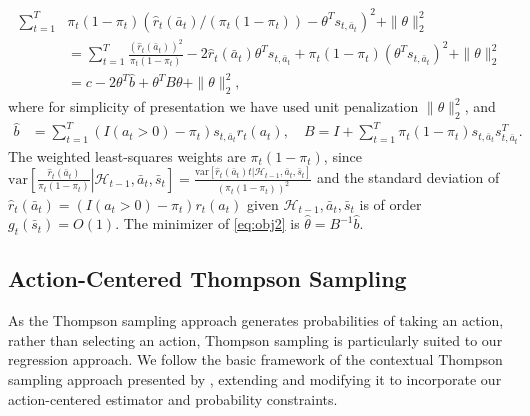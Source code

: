 \documentclass{article}
\begin{document}
\begin{align}\label{eq:obj2}
\sum\nolimits_{t=1}^T&  \pi_t (1-\pi_t)(\hat{r}_t(\bar{a}_t)/(\pi_t (1-\pi_t)) -  \theta^T s_{t,\bar{a}_t} )^2+\|\theta\|_2^2\\\nonumber &= \sum\nolimits_{t=1}^T \frac{(\hat{r}_t(\bar{a}_t))^2}{\pi_t(1-\pi_t)} - 2\hat{r}_t(\bar{a}_t)\theta^T s_{t,\bar{a}_t} + \pi_t (1-\pi_t)(\theta^T s_{t,\bar{a}_t})^2+\|\theta\|_2^2\\\nonumber&= c - 2\theta^T \hat{b} + \theta^T B \theta+\|\theta\|_2^2,
\end{align}
where for simplicity of presentation we have used unit penalization $\|\theta\|_2^2$, and 
\begin{align*}
\hat{b} &=  \sum\nolimits_{t = 1}^T (I(a_t>0) - \pi_t)s_{t,\bar{a}_t} r_t(a_t),\quad
B =  I + \sum\nolimits_{t=1}^T \pi_t (1-\pi_t) s_{t,\bar{a}_t}s_{t,\bar{a}_t}^T.
\end{align*}
The weighted least-squares weights are $\pi_t (1-\pi_t)$, since $\mathrm{var}\left[\left.\frac{\hat{r}_t(\bar{a}_t)}{\pi_t (1-\pi_t)}\right| \mathcal{H}_{t-1}, \bar{a}_t, \bar{s}_t\right] = \frac{\mathrm{var}[\hat{r}_t(\bar{a}_t)t| \mathcal{H}_{t-1}, \bar{a}_t, \bar{s}_t]}{(\pi_t(1-\pi_t))^2}$ and the standard deviation of $\hat{r}_t(\bar{a}_t) = (I(a_t>0) - \pi_t) r_t(a_t)$ given $ \mathcal{H}_{t-1}, \bar{a}_t, \bar{s}_t$ is of order $g_t(\bar{s}_t) = O(1)$.
 The minimizer of \eqref{eq:obj2} is
 $%
 \hat{\theta} = B^{-1} \hat{b}$. %
 
 
 
 
 
 
 \subsection{Action-Centered Thompson Sampling}
 As the Thompson sampling approach generates probabilities of taking an action, rather than selecting an action, Thompson sampling is particularly suited to our regression approach. We follow the basic framework of the contextual Thompson sampling approach presented by \cite{agrawal2013thompson}, extending and modifying it to incorporate our action-centered estimator and probability constraints. 
 
\end{document}
